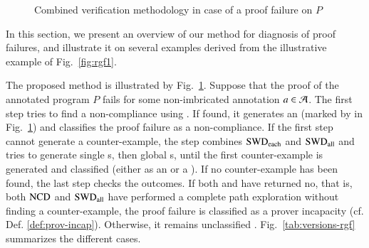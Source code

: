 \begin{figure}[b]
\caption{Combined verification methodology in case of a proof failure on $P$}
\label{fig:method-short}
\end{figure}


In this section, we present an overview of our method for 
diagnosis of proof failures, 
and illustrate it on several examples derived from the illustrative example
of Fig.~\ref{fig:rgf1}.


The proposed method is illustrated by Fig.~\ref{fig:method-short}.
Suppose that the proof of the annotated program $P$ fails for some non-imbricated annotation $a\in{\ensuremath\mathcal{A}}$.
The first step tries to find a non-compliance using \NCD. 
If found, it generates an \NCCE (marked by  in Fig.~\ref{fig:method-short})
and classifies the proof failure as a non-compliance.
If the first step cannot generate a counter-example,
the \CWD step combines $\mathrm{SWD}_\mathrm{each}$ and $\mathrm{SWD}_\mathrm{all}$ 
and tries to generate single \CWCE{}s, then global \CWCE{}s, 
until the first counter-example is generated and classified 
(either as an \NCCE {} or a \CWCE {}).
If no counter-example has been found, the last step checks the outcomes.
If both \NCD and \CWD have returned \textsf{no}, that is, 
both  $\mathrm{NCD}$  and $\mathrm{SWD}_\mathrm{all}$ have performed a complete path exploration 
without finding a counter-example,
the proof failure is classified as a prover incapacity  (cf. Def. \ref{def:prov-incap}).
Otherwise, it  remains unclassified .
Fig.~\ref{tab:versions-rgf} summarizes the different cases.

